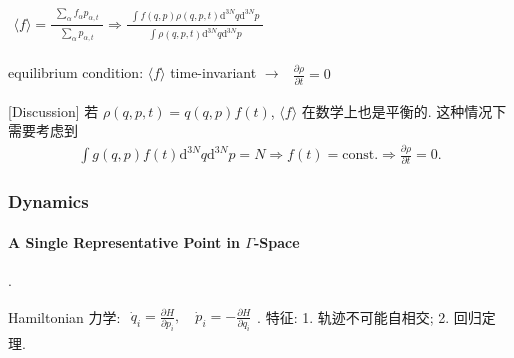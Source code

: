 \documentclass[../../main.tex]{subfiles}
\begin{document}
$\begin{aligned}
    \langle f\rangle = \frac{\begin{aligned}
        \sum_{\alpha}f_{\alpha}p_{\alpha,t}
    \end{aligned}}{\begin{aligned}
        \sum_{\alpha} p_{\alpha,t}
    \end{aligned}}\Longrightarrow  \frac{\begin{aligned}
        \int f(q,p)\rho(q,p,t)\mathrm{d}^{3N}q\mathrm{d}^{3N}p
    \end{aligned}}{\begin{aligned}
        \int \rho(q,p,t)\mathrm{d}^{3N}q\mathrm{d}^{3N}p
    \end{aligned}}
\end{aligned}$

equilibrium condition: $\langle f\rangle$ time-invariant $\rightarrow$ $\begin{aligned}
    \frac{\partial \rho}{\partial t} = 0
\end{aligned}$

[Discussion] 若 $\rho(q,p,t) = q(q,p)f(t)$, $\langle f\rangle$ 在数学上也是平衡的. 这种情况下需要考虑到
\begin{align*}
    \int g(q,p)f(t)\mathrm{d}^{3N}q\mathrm{d}^{3N}p = N\Rightarrow f(t) = \text{const.}\Rightarrow \frac{\partial \rho}{\partial t} = 0.
\end{align*}

\subsubsection{Dynamics}
\paragraph{A Single Representative Point in $\Gamma$-Space}.

Hamiltonian 力学: $\begin{aligned}
    \dot{q}_{i} = \frac{\partial H}{\partial p_{i}},\quad \dot{p}_{i} = -\frac{\partial H}{\partial q_{i}}
\end{aligned}$. 
特征: 1. 轨迹不可能自相交; 2. 回归定理. 
\end{document}
